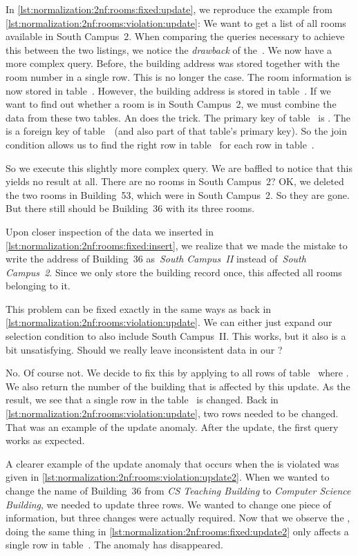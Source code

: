 In \cref{lst:normalization:2nf:rooms:fixed:update}, we reproduce the example from \cref{lst:normalization:2nf:rooms:violation:update}:
We want to get a list of all rooms available in South Campus~2.
When comparing the queries necessary to achieve this between the two listings, we notice the \emph{drawback} of the~.
We now have a more complex query.
Before, the building address was stored together with the room number in a single row.
This is no longer the case.
The room information is now stored in table~.
However, the building address is stored in table~.
If we want to find out whether a room is in South Campus~2, we must combine the data from these two tables.
An  does the trick.
The primary key of table~ is .
The  is a foreign key of table~~(and also part of that table's primary key).
So the join condition  allows us to find the right row in table~ for each row in table~.

So we execute this slightly more complex query.
We are baffled to notice that this yields no result at all.
There are no rooms in South Campus~2?
OK, we deleted the two rooms in Building~53, which were in South Campus~2.
So they are gone.
But there still should be Building~36 with its three rooms.

Upon closer inspection of the data we inserted in \cref{lst:normalization:2nf:rooms:fixed:insert}, we realize that we made the mistake to write the address of Building~36 as~\emph{South Campus~II} instead of~\emph{South Campus~2}.
Since we only store the building record once, this affected all rooms belonging to it.

This problem can be fixed exactly in the same ways as back in \cref{lst:normalization:2nf:rooms:violation:update}.
We can either just expand our selection condition to also include South Campus~II.
This works, but it also is a bit unsatisfying.
Should we really leave inconsistent data in our \db?

No.
Of course not.
We decide to fix this by applying  to all rows of table~ where .
We also return the number of the building that is affected by this update.
As the result, we see that a single row in the table~ is changed.
Back in \cref{lst:normalization:2nf:rooms:violation:update}, two rows needed to be changed.
That was an example of the update anomaly.
After the update, the first query works as expected.

A clearer example of the update anomaly that occurs when the  is violated was given in \cref{lst:normalization:2nf:rooms:violation:update2}.
When we wanted to change the name of Building~36 from \emph{CS Teaching Building} to \emph{Computer Science Building}, we needed to update three rows.
We wanted to change one piece of information, but three changes were actually required.
Now that we observe the , doing the same thing in \cref{lst:normalization:2nf:rooms:fixed:update2} only affects a single row in table~.
The anomaly has disappeared.%
%
\FloatBarrier%
\endhsection%
%
